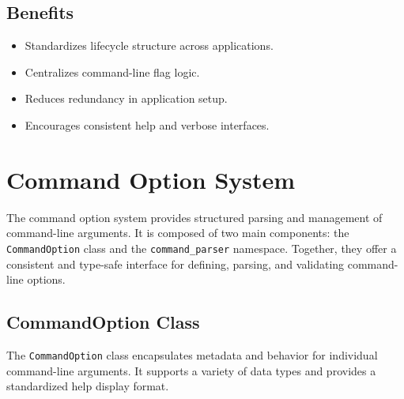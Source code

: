 \subsection*{Benefits}
\begin{itemize}
	\item Standardizes lifecycle structure across applications.
	\item Centralizes command-line flag logic.
	\item Reduces redundancy in application setup.
	\item Encourages consistent help and verbose interfaces.
\end{itemize}










\section{Command Option System}

The command option system provides structured parsing and management of command-line arguments. It is composed of two main components: the \texttt{CommandOption} class and the \texttt{command\_parser} namespace. Together, they offer a consistent and type-safe interface for defining, parsing, and validating command-line options.

\subsection{CommandOption Class}

The \texttt{CommandOption} class encapsulates metadata and behavior for individual command-line arguments. It supports a variety of data types and provides a standardized help display format.


